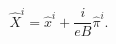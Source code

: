 \begin{equation}
\widehat{X}^{i}=\hat{x}^{i}+\frac{i}{eB}\hat{\pi}^{i}.\label{2.8}%
\end{equation}

